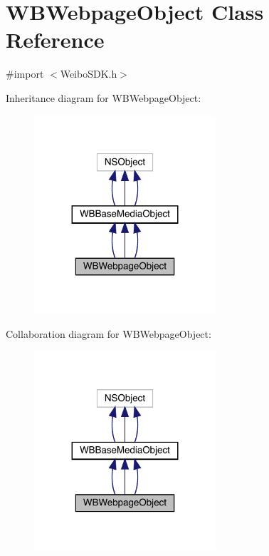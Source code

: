 \hypertarget{interface_w_b_webpage_object}{}\section{W\+B\+Webpage\+Object Class Reference}
\label{interface_w_b_webpage_object}


{\ttfamily \#import $<$Weibo\+S\+D\+K.\+h$>$}



Inheritance diagram for W\+B\+Webpage\+Object\+:\nopagebreak
\begin{figure}[H]
\begin{center}
\leavevmode
\includegraphics[width=191pt]{interface_w_b_webpage_object__inherit__graph}
\end{center}
\end{figure}


Collaboration diagram for W\+B\+Webpage\+Object\+:\nopagebreak
\begin{figure}[H]
\begin{center}
\leavevmode
\includegraphics[width=191pt]{interface_w_b_webpage_object__coll__graph}
\end{center}
\end{figure}
